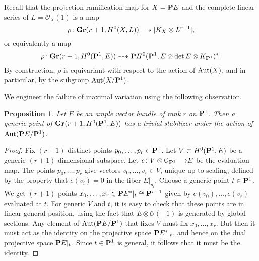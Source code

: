 \documentclass[11pt,reqno]{amsart}
\theoremstyle{plain}
\newtheorem{proposition}[theorem]{Proposition}
\theoremstyle{definition}
\theoremstyle{remark}
\numberwithin{equation}{section}
\renewcommand{\to}{{\longrightarrow}}
\numberwithin{equation}{section}
\renewcommand{\O}{\mathcal O}
\begin{document}
Recall that the projection-ramification map for $X = \P E$ and the complete linear series of $L = \O_X(1)$ is a map
\[ \rho \from \Gr(r+1, H^0(X, L)) \dashrightarrow |K_X \otimes L^{r+1}|,\]
or equivalently a map
\[ \rho \from \Gr(r+1, H^0(\P^1, E)) \dashrightarrow \P H^0(\P^1, E \otimes \det E \otimes K_{\P^1})^*.\]
By construction, $\rho$ is equivariant with respect to the action of $\Aut(X)$, and in particular, by the subgroup $\Aut(X/\P^1)$.

We engineer the failure of maximal variation using the following observation.
\begin{proposition}\label{prop:trivialStabilizer}
  Let $E$ be an ample vector bundle of rank $r$ on $\P^1$.
  Then a generic point of $\Gr(r+1, H^0(\P^1, E))$ has a trivial stabilizer under the action of $\Aut(\P E/\P^1)$.
\end{proposition}
\begin{proof}
  Fix $(r+1)$ distinct points $p_0, \dots, p_r \in \P^1$.
  Let $V \subset H^0(\P^1, E)$ be a generic $(r+1)$ dimensional subspace.
  Let $e \from V \otimes \O_{\P^1} \to E$ be the evaluation map.
  The points $p_0, \dots, p_r$ give vectors $v_0, \dots, v_r \in V$, unique up to scaling, defined by the property that $e(v_i) = 0$ in the fiber $E|_{p_i}$.
  Choose a generic point $t \in \P^1$.
  We get $(r+1)$ points $x_0, \dots, x_r \in \P E^*|_{t} \cong \P^{r-1}$ given by $e(v_0), \dots, e(v_r)$ evaluated at $t$.
  For generic $V$ and $t$, it is easy to check that these points are in linear general position, using the fact that $E \otimes \O(-1)$ is generated by global sections.
  Any element of $\Aut(\P E/\P^1)$ that fixes $V$ must fix $x_0, \dots, x_r$.
  But then it must act as the identity on the projective space $\P E^*|_t$, and hence on the dual projective space $\P E|_t$.
  Since $t \in \P^1$ is general, it follows that it must be the identity.
\end{proof}
\end{document}
